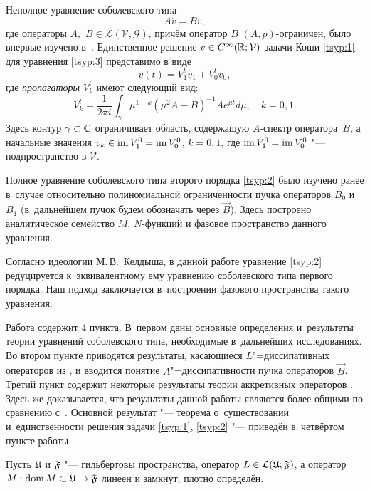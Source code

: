 Неполное уравнение соболевского типа
\begin{equation}
A\ddot{v}=Bv, 
\label{tsyp:3}
\end{equation}
где операторы $A,$ $ B\in {\mathcal L} (\mathcal V,\mathcal G)$,
причём оператор $B$ $(A,p)$-ограничен, было впервые изучено в~\cite{zamtsyp:bib:Sviridyuk}.
Единственное решение $v\in C^\infty(\Bbb R;\mathcal V)$ задачи Коши \eqref{tsyp:1} для уравнения \eqref{tsyp:3} представимо в виде $$v(t)=V^{t}_{1}v_1+V^{t}_{0}v_0, $$
где \textit{пропагаторы} $V^{t}_{k}$ имеют следующий вид:
 $$V^{t}_{k}=\frac{1}{2 \pi i}\int_\gamma\mu^{1-k}\left(\mu^2A-B\right)^{-1}Ae^{\mu t}d\mu,\quad k=0, 1. $$ 
Здесь контур $\gamma\subset \Bbb C$ ограничивает область, содержащую $A$-спектр оператора~$B$, а начальные значения
$v_k \in \mathop{\rm im} V^{0}_{1}=\mathop{\rm im} V^{0}_{0}$, $k=0, 1$,
где $\mathop{\rm im} \dot{V}^{0}_{1}=\mathop{\rm im} V^{0}_{0}$ "---
подпространство в $\mathcal{V}$.

Полное уравнение соболевского типа второго порядка \eqref{tsyp:2} было
изучено ранее \cite{zamtsyp:bib:Zamyshlyaeva} в~случае относительно полиномиальной
ограниченности пучка операторов $B_{0}$ и $B_{1}$ (в~дальнейшем пучок будем обозначать через $\vec{B}$). 
Здесь построено аналитическое семейство $M$, $N$-функций и фазовое пространство данного уравнения.

Согласно идеологии М.\,В.~Келдыша, в данной работе уравнение \eqref{tsyp:2}
редуцируется к~эквивалентному ему уравнению соболевского типа первого порядка. 
Наш подход заключается в~построении фазового пространства такого уравнения.

Работа содержит 4 пункта. 
В~первом даны основные определения и~результаты теории уравнений соболевского типа, необходимые в~дальнейших исследованиях. 
Во втором пункте приводятся результаты, касающиеся $L$"=диссипативных операторов из \cite{zamtsyp:bib:Fedorov}, и вводится понятие $A$"=диссипативности пучка операторов $\vec{B}$. 
Третий пункт содержит некоторые результаты теории аккретивных операторов \cite{zamtsyp:bib:Showalter}. 
Здесь же доказывается, что результаты данной работы являются более общими по сравнению с~\cite{zamtsyp:bib:Showalter}. 
Основной результат "--- теорема о~существовании и~единственности решения задачи \eqref{tsyp:1}, \eqref{tsyp:2} "--- приведён в~четвёртом пункте работы.

\smallskip

Пусть $\frak U$ и $\frak F$ "--- гильбертовы пространства, оператор $L\in \mathcal L (\frak U;\frak F)$, а оператор  $M: \mathop{\rm dom} M\subset\frak U\rightarrow\frak F$ линеен и замкнут, плотно определён.


